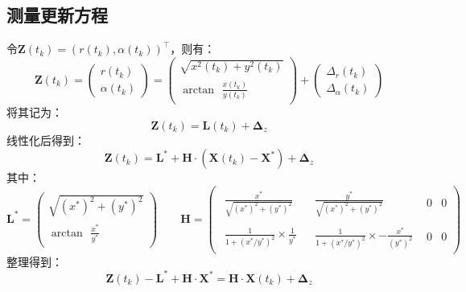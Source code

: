 \documentclass[12pt, onecolumn]{article}
\newcommand\normf{\fangsong}
\begin{document}
	\subsection{\normf 测量更新方程}
	令$\boldsymbol{Z}(t_k)=\left( r(t_k),\alpha(t_k)\right) ^\top$，则有：
	\begin{equation}
	\boldsymbol{Z}(t_k)=\begin{pmatrix}
	r(t_k)\\\alpha(t_k)
	\end{pmatrix}=\begin{pmatrix}
	\sqrt{x^2(t_k)+y^2(t_k)}\\
	\arctan\begin{aligned}
	\frac{x(t_k)}{y(t_k)}
	\end{aligned}
	\end{pmatrix}+
	\begin{pmatrix}
	\Delta_r(t_k)\\\Delta_\alpha(t_k)
	\end{pmatrix}
	\end{equation}
	将其记为：
	\begin{equation}
	\boldsymbol{Z}(t_k)=\boldsymbol{L}(t_k)+\boldsymbol{\Delta}_z
	\end{equation}
	线性化后得到：
	\begin{equation}
	\boldsymbol{Z}(t_k)=\boldsymbol{L^*}+\boldsymbol{H}\cdot\left(
	\boldsymbol{X}(t_k)-\boldsymbol{X^*}
	\right) +\boldsymbol{\Delta}_z
	\end{equation}
	其中：
	\begin{equation}
	\boldsymbol{L^*}=\begin{pmatrix}
		\sqrt{(x^*)^2+(y^*)^2}\\
		\arctan\begin{aligned}
		\frac{x^*}{y^*}
		\end{aligned}
		\end{pmatrix}
		\qquad
		\boldsymbol{H}=\begin{pmatrix}
			\begin{aligned}
			\frac{x^*}{\sqrt{(x^*)^2+(y^*)^2}}
			\end{aligned}
		&
			\begin{aligned}
			\frac{y^*}{\sqrt{(x^*)^2+(y^*)^2}}
			\end{aligned}
		&0&0\\
		\begin{aligned}
		\frac{1}{1+(x^*/y^*)^2}\times\frac{1}{y^*}
		\end{aligned}
		&
		\begin{aligned}
		\frac{1}{1+(x^*/y^*)^2}\times-\frac{x^*}{(y^*)^2}
		\end{aligned}
		&0&0
		\end{pmatrix}
	\end{equation}
	整理得到：
	\begin{equation}
	\boldsymbol{Z}(t_k)-\boldsymbol{L^*}+\boldsymbol{H}\cdot\boldsymbol{X^*}
	=\boldsymbol{H}\cdot\boldsymbol{X}(t_k)	+\boldsymbol{\Delta}_z
	\end{equation}
	
\end{document}
